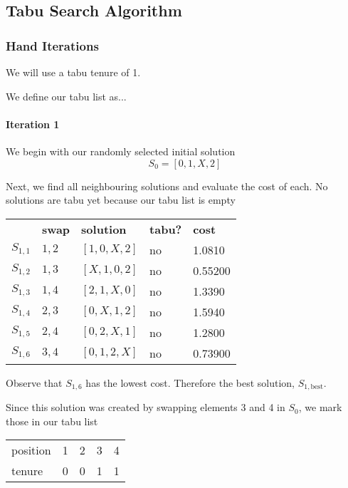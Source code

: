 \documentclass[a4paper]{article}
\newcommand{\subsubsubsection}[1]{\paragraph{#1} \mbox{}}
\begin{document}


\subsection{Tabu Search Algorithm} %

\subsubsection{Hand Iterations}

We will use a tabu tenure of 1.

We define our tabu list as...

\subsubsubsection{Iteration 1}

We begin with our randomly selected initial solution
$$S_0 = [ 0, 1, X, 2 ]$$

Next, we find all neighbouring solutions and evaluate the cost of each. No solutions are tabu yet because our tabu list is empty

\begin{tabular}{lllll}
& \textbf{swap}   & \textbf{solution}    & \textbf{tabu?} & \textbf{cost}  \\

$S_{1,1}$ & $1,2$ & $[1, 0, X, 2]$ & no & 1.0810   \\
$S_{1,2}$ & $1,3$ & $[X, 1, 0, 2]$ & no & 0.55200  \\
$S_{1,3}$ & $1,4$ & $[2, 1, X, 0]$ & no & 1.3390   \\
$S_{1,4}$ & $2,3$ & $[0, X, 1, 2]$ & no & 1.5940   \\
$S_{1,5}$ & $2,4$ & $[0, 2, X, 1]$ & no & 1.2800   \\
$S_{1,6}$ & $3,4$ & $[0, 1, 2, X]$ & no & 0.73900  \\
\end{tabular}

Observe that $S_{1,6}$ has the lowest cost. Therefore the best solution, $S_{1, \text{best}}$.

Since this solution was created by swapping elements 3 and 4 in $S_0$, we mark those in our tabu list

\begin{tabular}{lllll}
position & 1 & 2 & 3 & 4 \\
tenure   & 0 & 0 & 1 & 1
\end{tabular}
\vspace{1.5em}
\end{document}
